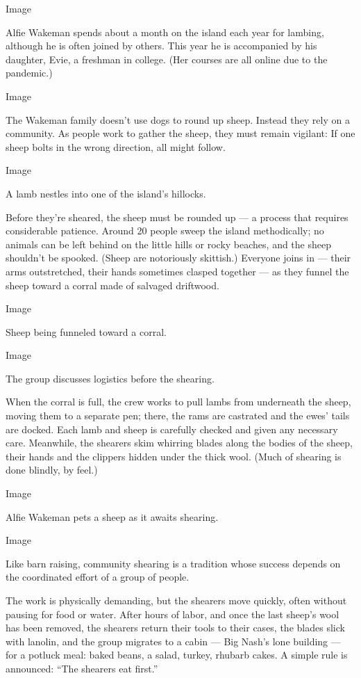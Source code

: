 Image

Alfie Wakeman spends about a month on the island each year for lambing,
although he is often joined by others. This year he is accompanied by
his daughter, Evie, a freshman in college. (Her courses are all online
due to the pandemic.)

Image

The Wakeman family doesn't use dogs to round up sheep. Instead they rely
on a community. As people work to gather the sheep, they must remain
vigilant: If one sheep bolts in the wrong direction, all might follow.

Image

A lamb nestles into one of the island's hillocks.

Before they're sheared, the sheep must be rounded up --- a process that
requires considerable patience. Around 20 people sweep the island
methodically; no animals can be left behind on the little hills or rocky
beaches, and the sheep shouldn't be spooked. (Sheep are notoriously
skittish.) Everyone joins in --- their arms outstretched, their hands
sometimes clasped together --- as they funnel the sheep toward a corral
made of salvaged driftwood.

Image

Sheep being funneled toward a corral.

Image

The group discusses logistics before the shearing.

When the corral is full, the crew works to pull lambs from underneath
the sheep, moving them to a separate pen; there, the rams are castrated
and the ewes' tails are docked. Each lamb and sheep is carefully checked
and given any necessary care. Meanwhile, the shearers skim whirring
blades along the bodies of the sheep, their hands and the clippers
hidden under the thick wool. (Much of shearing is done blindly, by
feel.)

Image

Alfie Wakeman pets a sheep as it awaits shearing.

Image

Like barn raising, community shearing is a tradition whose success
depends on the coordinated effort of a group of people.

The work is physically demanding, but the shearers move quickly, often
without pausing for food or water. After hours of labor, and once the
last sheep's wool has been removed, the shearers return their tools to
their cases, the blades slick with lanolin, and the group migrates to a
cabin --- Big Nash's lone building --- for a potluck meal: baked beans,
a salad, turkey, rhubarb cakes. A simple rule is announced: ``The
shearers eat first.''

